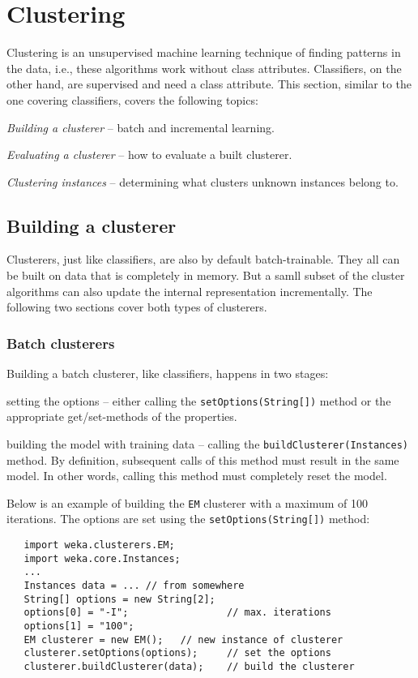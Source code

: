 \newpage

\section{Clustering}
Clustering is an unsupervised machine learning technique of finding patterns in
the data, i.e., these algorithms work without class attributes. Classifiers, on
the other hand, are supervised and need a class attribute. This section,
similar to the one covering classifiers, covers the following topics:
\begin{tight_itemize}
	\item \textit{Building a clusterer} -- batch and incremental learning.
	\item \textit{Evaluating a clusterer} -- how to evaluate a built clusterer.
	\item \textit{Clustering instances} -- determining what clusters unknown
instances belong to.
\end{tight_itemize}

\subsection{Building a clusterer}
Clusterers, just like classifiers, are also by default batch-trainable. They
all can be built on data that is completely in memory. But a samll subset of
the cluster algorithms can also update the internal representation
incrementally. The following two sections cover both types of clusterers.

\subsubsection*{Batch clusterers}
Building a batch clusterer, like classifiers, happens in two stages:
\begin{tight_itemize}
	\item setting the options -- either calling the
\texttt{setOptions(String[])} method or the appropriate get/set-methods of the
properties.
	\item building the model with training data -- calling the
\texttt{buildClusterer(Instances)} method. By definition, subsequent calls of
this method must result in the same model. In other words, calling this method
must completely reset the model.
\end{tight_itemize}
Below is an example of building the \texttt{EM} clusterer with a maximum of 100
iterations. The options are set using the \texttt{setOptions(String[])} method:
\begin{verbatim}
   import weka.clusterers.EM;
   import weka.core.Instances;
   ...
   Instances data = ... // from somewhere
   String[] options = new String[2];
   options[0] = "-I";                 // max. iterations
   options[1] = "100";
   EM clusterer = new EM();   // new instance of clusterer
   clusterer.setOptions(options);     // set the options
   clusterer.buildClusterer(data);    // build the clusterer
\end{verbatim}

